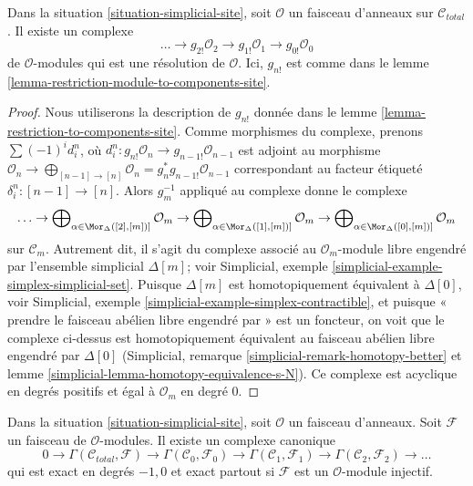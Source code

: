 \begin{lemma}
\label{lemma-simplicial-resolution-ringed}
Dans la situation \ref{situation-simplicial-site}, soit $\mathcal{O}$
un faisceau d'anneaux sur $\mathcal{C}_{total}$. Il existe un complexe
$$
\ldots \to g_{2!}\mathcal{O}_2 \to g_{1!}\mathcal{O}_1 \to g_{0!}\mathcal{O}_0
$$
de $\mathcal{O}$-modules qui est une résolution de
$\mathcal{O}$.
Ici, $g_{n!}$ est comme dans le lemme \ref{lemma-restriction-module-to-components-site}.
\end{lemma}

\begin{proof}
Nous utiliserons la description de $g_{n!}$ donnée dans le
lemme \ref{lemma-restriction-to-components-site}.
Comme morphismes du complexe, prenons $\sum (-1)^i d^n_i$, où
$d^n_i : g_{n!}\mathcal{O}_n \to g_{n - 1!}\mathcal{O}_{n - 1}$
est adjoint au morphisme
$\mathcal{O}_n \to \bigoplus_{[n - 1] \to [n]} \mathcal{O}_n =
g_n^*g_{n - 1!}\mathcal{O}_{n - 1}$
correspondant au facteur étiqueté $\delta^n_i : [n - 1] \to [n]$.
Alors $g_m^{-1}$ appliqué au complexe donne le complexe
$$
\ldots \to
\bigoplus\nolimits_{\alpha \in \Mor_\Delta([2], [m])]} \mathcal{O}_m \to
\bigoplus\nolimits_{\alpha \in \Mor_\Delta([1], [m])]} \mathcal{O}_m \to
\bigoplus\nolimits_{\alpha \in \Mor_\Delta([0], [m])]} \mathcal{O}_m
$$
sur $\mathcal{C}_m$.
Autrement dit, il s'agit du complexe associé au
$\mathcal{O}_m$-module libre engendré par l'ensemble simplicial $\Delta[m]$; voir
Simplicial, exemple \ref{simplicial-example-simplex-simplicial-set}.
Puisque $\Delta[m]$ est homotopiquement équivalent à $\Delta[0]$, voir
Simplicial, exemple \ref{simplicial-example-simplex-contractible},
et puisque « prendre le faisceau abélien libre engendré par » est un foncteur,
on voit que le complexe ci-dessus est homotopiquement équivalent au
faisceau abélien libre engendré par $\Delta[0]$
(Simplicial, remarque \ref{simplicial-remark-homotopy-better} et
lemme \ref{simplicial-lemma-homotopy-equivalence-s-N}).
Ce complexe est acyclique en degrés positifs
et égal à $\mathcal{O}_m$ en degré $0$.
\end{proof}

\begin{lemma}
\label{lemma-cech-complex-modules}
Dans la situation \ref{situation-simplicial-site}, soit $\mathcal{O}$
un faisceau d'anneaux. Soit $\mathcal{F}$ un faisceau
de $\mathcal{O}$-modules. Il existe un complexe canonique
$$
0 \to \Gamma(\mathcal{C}_{total}, \mathcal{F}) \to
\Gamma(\mathcal{C}_0, \mathcal{F}_0) \to
\Gamma(\mathcal{C}_1, \mathcal{F}_1) \to
\Gamma(\mathcal{C}_2, \mathcal{F}_2) \to \ldots
$$
qui est exact en degrés $-1, 0$ et exact partout
si $\mathcal{F}$ est un $\mathcal{O}$-module injectif.
\end{lemma}

